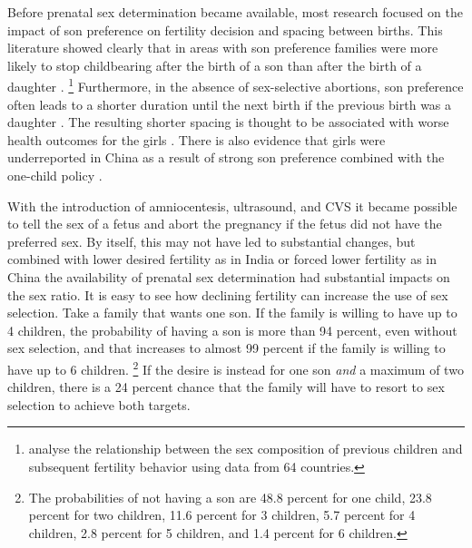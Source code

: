 \documentclass[letterpaper,12pt]{article}
\begin{document}
Before prenatal sex determination became available, most
research focused on the impact of son preference on
fertility decision and spacing between births.
This literature showed clearly that in areas with son preference families were 
more likely to stop  childbearing after the birth of a son than after the birth 
of a daughter \citep[see, for example,][]{Das1987,Arnold1997,clark00}.%
\footnote{
\citet{filmer09} analyse the relationship between the sex composition of previous
children and subsequent fertility behavior using data from 64 countries.
}
Furthermore, in the absence of sex-selective abortions, son preference 
often leads to a shorter duration until the next birth if the previous 
birth was a daughter 
\citep[see, for example,][]{Das1987,Rahman1993,Pong1994,Haughton1996,Arnold1997}.
The resulting shorter spacing is thought to be associated with worse 
health outcomes for the girls 
\citep{arnold98,Whitworth2002,Rutstein2005,Conde-Agudelo2006}.
There is also evidence that girls were underreported in China
as a result of strong son preference combined with the one-child
policy \citep{Merli2000}.

With the introduction of amniocentesis, ultrasound, and CVS it became
possible to tell the sex of a fetus and abort the pregnancy if the
fetus did not have the preferred sex. 
By itself, this may not have led to substantial changes, but combined
with lower desired fertility as in India or forced lower fertility
as in China the availability of prenatal sex determination had 
substantial impacts on the sex ratio.
It is easy to see how declining fertility can increase the use of sex selection.
Take a family that wants one son.
If the family is willing to have up to 4 children, the probability of having a son
is more than 94 percent, even without sex selection, and that increases to almost 99 
percent if the family is willing to have up to 6 children.%
\footnote{
The probabilities of not having a son are 48.8 percent for one child, 23.8 percent for
two children, 11.6 percent for 3 children, 5.7 percent for 4 children, 2.8 percent
for 5 children, and 1.4 percent for 6 children.
}
If the desire is instead for one son \emph{and} a maximum of two children, there 
is a 24 percent chance that the family will have to resort to sex selection to 
achieve both targets.
\end{document}
